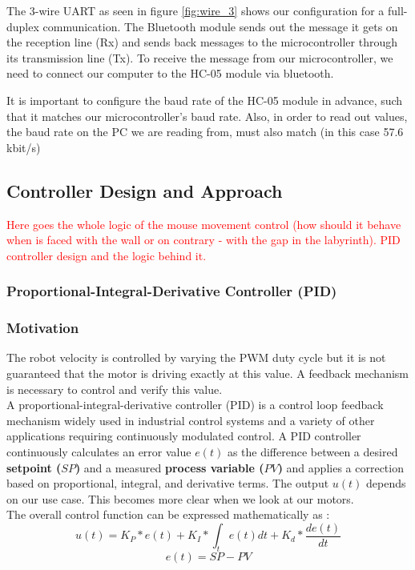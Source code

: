 The 3-wire UART as seen in figure \ref{fig:wire_3} shows our configuration for a full-duplex communication. The Bluetooth module sends out the message it gets on the reception line (Rx) and sends back messages to the microcontroller through its transmission line (Tx). To receive the message from our microcontroller, we need to connect our computer to the HC-05 module via bluetooth.

It is important to configure the baud rate of the HC-05 module in advance, such that it matches our microcontroller's baud rate. Also, in order to read out values, the baud rate on the PC we are reading from, must also match (in this case 57.6 kbit/s)


\subsection{Controller Design and Approach}

\textcolor{red}{
Here goes the whole logic of the mouse movement control (how should it behave when is faced with the wall or on contrary - with the gap in the labyrinth). PID controller design and the logic behind it.
}

\subsubsection{Proportional-Integral-Derivative Controller (PID)}
\subsubsection*{Motivation}

The robot velocity is controlled by varying the PWM duty cycle but it is not guaranteed that the motor is driving exactly at this value. A feedback mechanism is necessary to control and verify this value.\\
A proportional-integral-derivative controller (PID) is a control loop feedback mechanism widely used in industrial control systems and a variety of other applications requiring continuously modulated control. A PID controller continuously calculates an error value $e(t)$ as the difference between a desired \textbf{setpoint ($SP$)} and a measured \textbf{process variable ($PV$)} and applies a correction based on proportional, integral, and derivative terms. The output $u(t)$ depends on our use case. This becomes more clear when we look at our motors.\\
The overall control function can be expressed mathematically as : 
$$u(t)= K_{P}*e(t) + K_{I}*\int_t e(t) dt + K_{d}*\frac{d e(t)}{dt} $$
$$e(t) = SP - PV$$
 
